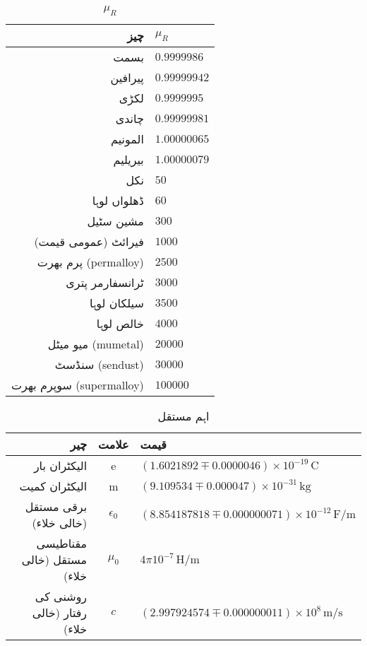 {\renewcommand{\arraystretch}{1.2}
\begin{table}
\caption{$\mu_R$}
\centering
\begin{tabular}{r | l}
\hline
چیز & $\mu_R$ \\
\hline
بسمت & $\num{0.9999986}$\\
پیرافین & $\num{0.99999942}$\\
لکڑی & $\num{0.9999995}$\\
چاندی & $\num{0.99999981}$\\
المونیم & $\num{1.00000065}$\\
بیریلیم & $\num{1.00000079}$\\
نکل & $\num{50}$\\
ڈھلواں لوہا & $\num{60}$\\
مشین سٹیل & $\num{300}$\\
فیرائٹ (عمومی قیمت) & $\num{1000}$\\
پرم بھرت (permalloy) & $\num{2500}$\\
ٹرانسفارمر پتری & $\num{3000}$\\
سیلکان لوہا & $\num{3500}$\\
خالص لوہا & $\num{4000}$\\
میو میٹل (mumetal) & $\num{20000}$\\
سنڈسٹ (sendust) & $\num{30000}$\\
سوپرم بھرت (supermalloy) & $\num{100000}$\\
\end{tabular}
\label{جدول_جدول_جزوی_مقناطیسی_مستقل}
\end{table}
}
{\renewcommand{\arraystretch}{1.2}
\begin{table}
\caption{اہم مستقل}
\centering
\begin{tabular}{r |c | l}
\hline
چیر & علامت & قیمت\\
\hline
الیکٹران بار & e & $(\num{1.6021892} \mp \num{0.0000046})\times 10^{-19} \, \si{\coulomb}$\\
الیکٹران کمیت & m & $(\num{9.109534} \mp  \num{0.000047}) \times 10^{-31} \, \si{\kilogram}$\\
برقی مستقل (خالی خلاء) & $\epsilon_0$ & $(\num{8.854187818} \mp \num{0.000000071} ) \times 10^{-12} \, \si{\farad \per \meter}$\\
مقناطیسی مستقل (خالی خلاء) & $\mu_0$  &   $4 \pi 10^{-7} \, \si{\henry \per \meter}$\\
روشنی کی رفتار (خالی خلاء) & $c$ & $(\num{2.997924574} \mp \num{0.000000011}) \times 10^{8} \, \si{\meter \per \second}$\\
\end{tabular}
\label{جدول-جدول_اہم_مستقل}
\end{table}
}
